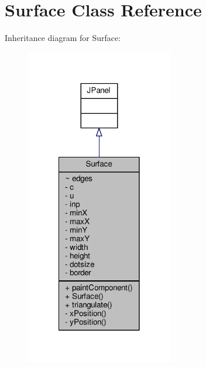 \hypertarget{classSurface}{\section{Surface Class Reference}
\label{classSurface}
}


Inheritance diagram for Surface\-:
\nopagebreak
\begin{figure}[H]
\begin{center}
\leavevmode
\includegraphics[width=182pt]{classSurface__inherit__graph}
\end{center}
\end{figure}


